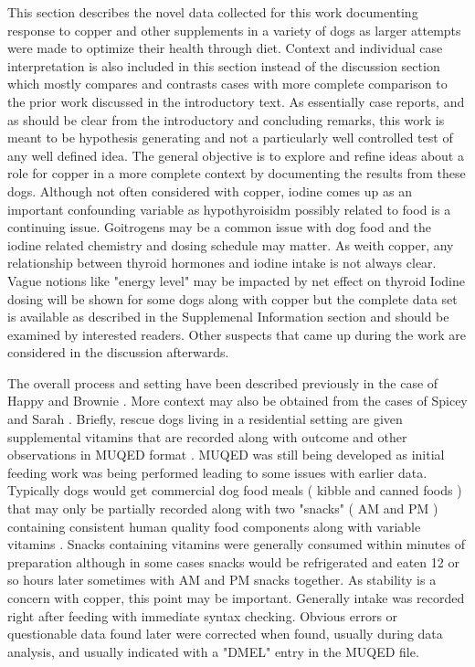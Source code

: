 This section describes the 
novel data collected for this work documenting
response to copper and other supplements in a variety of dogs
as larger attempts were made to optimize their health through diet.
Context and individual case interpretation is also included in this section
 instead of the
discussion section which mostly compares and contrasts  
cases with more complete comparison to the prior work discussed
in the introductory text.  
As essentially case reports, and as should be clear from the 
introductory and concluding remarks,
this work is meant to be hypothesis generating and not a particularly
well controlled test of any well defined idea.  The general objective
is to explore and refine ideas about a role for copper in a more
complete context by documenting the results from these dogs. 
Although not often considered with copper, iodine comes up as
an important confounding variable as hypothyroisidm possibly
related to food is a continuing issue. 
Goitrogens may be a common issue with dog food and the iodine related
chemistry and dosing schedule may matter.
As weith copper, any relationship between thyroid hormones and iodine intake
is not always clear. 
Vague notions like "energy level" may be impacted by net effect on thyroid
Iodine dosing will be shown for some dogs
along with copper but the complete data set is available
as described in the Supplemenal Information section and should
be examined by interested readers. 
Other suspects that came up during the work are  considered in the
discussion afterwards.   




\mjmdogsone

The overall process and setting  have been described previously
in the case of Happy
\cite{marchywka-MJM-2022-009-0.50rg}
\cite{mmarchywka-MJM-2019-001-.1li}
 and Brownie
\cite{mmarchywka-MJM-2021-003-v0.50rg}.
More context may also be obtained from the
cases of Spicey \cite{mmarchywka-MJM-2020-007rg}
and Sarah \cite{marchywka-MJM-2022-002-0.50rg}.
Briefly, rescue dogs living in a residential setting
are given supplemental vitamins that are recorded along
with outcome and other observations in MUQED format 
\cite{mmarchywka-MJM-2020-004-.012rg}.
MUQED was still being developed as initial feeding work 
was being performed leading to some issues with earlier data.
Typically dogs would get commercial dog food meals 
( kibble and canned foods ) 
that may only be partially recorded along with two "snacks" ( AM and PM ) 
containing consistent human quality food components along with variable
 vitamins \cite{marchywka-MJM-2021-018-0.50rg}.
Snacks containing vitamins were generally consumed within minutes
of preparation although in some cases snacks would be refrigerated
and eaten 12 or so hours later sometimes with AM and PM snacks together.
As stability is a concern with copper, this point may be important.
Generally intake was recorded right after feeding with immediate
syntax checking. Obvious errors or questionable data found later
were corrected when found, usually during data analysis,
 and usually indicated with a "DMEL" entry
in the MUQED file. 


